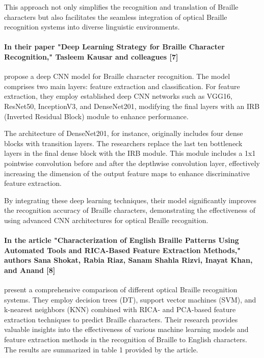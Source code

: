 This approach not only simplifies the recognition and translation of Braille characters but also facilitates the seamless integration of optical Braille recognition systems into diverse linguistic environments.

\paragraph{In their paper "Deep Learning Strategy for Braille Character Recognition," Tasleem Kausar and colleagues [7]}
 propose a deep CNN model for Braille character recognition. The model comprises two main layers: feature extraction and classification. For feature extraction, they employ established deep CNN networks such as VGG16, ResNet50, InceptionV3, and DenseNet201, modifying the final layers with an IRB (Inverted Residual Block) module to enhance performance.

The architecture of DenseNet201, for instance, originally includes four dense blocks with transition layers. The researchers replace the last ten bottleneck layers in the final dense block with the IRB module. This module includes a 1x1 pointwise convolution before and after the depthwise convolution layer, effectively increasing the dimension of the output feature maps to enhance discriminative feature extraction.

By integrating these deep learning techniques, their model significantly improves the recognition accuracy of Braille characters, demonstrating the effectiveness of using advanced CNN architectures for optical Braille recognition.

\paragraph{In the article "Characterization of English Braille Patterns Using Automated Tools and RICA-Based Feature Extraction Methods," authors Sana Shokat, Rabia Riaz, Sanam Shahla Rizvi, Inayat Khan, and Anand [8]}
present a comprehensive comparison of different optical Braille recognition systems. They employ decision trees (DT), support vector machines (SVM), and k-nearest neighbors (KNN) combined with RICA- and PCA-based feature extraction techniques to predict Braille characters. Their research provides valuable insights into the effectiveness of various machine learning models and feature extraction methods in the recognition of Braille to English characters. The results are summarized in table 1 provided by the article. 


